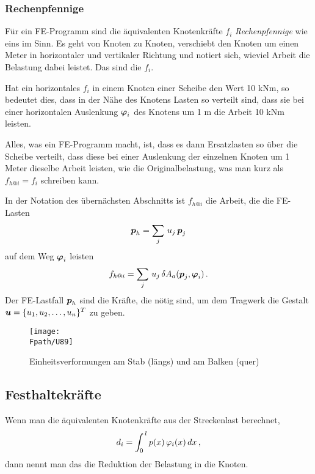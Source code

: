 {\textcolor{sectionTitleBlue}{\subsubsection*{Rechenpfennige}}}\label{Rechenpfennige}

F\"{u}r ein FE-Programm sind die \"{a}quivalenten Knotenkr\"{a}fte $f_i$ {\em Rechenpfennige\/} wie \glq eins im Sinn\grq{}. Es geht von Knoten zu Knoten, verschiebt den Knoten um einen Meter in horizontaler und vertikaler Richtung und notiert sich, wieviel Arbeit die Belastung dabei leistet. Das sind die $f_i$.

Hat ein horizontales $f_i$ in einem Knoten einer Scheibe den Wert 10 kNm, so bedeutet dies, dass in der N\"{a}he des Knotens Lasten so verteilt sind, dass sie bei einer horizontalen Auslenkung $\mbox{\boldmath $\varphi$}_i$ des Knotens um 1 m die Arbeit 10 kNm leisten.

Alles, was ein FE-Programm macht, ist, dass es dann Ersatzlasten so \"{u}ber die Scheibe verteilt, dass diese bei einer Auslenkung der einzelnen Knoten um 1 Meter dieselbe Arbeit leisten, wie die Originalbelastung, was man kurz als $f_{h @i}  = f_i$ schreiben kann.

In der Notation des \"{u}bern\"{a}chsten Abschnitts ist $f_{h @i}$ die Arbeit, die die FE-Lasten
\begin{align}
\mbox{\boldmath $p$}_h = \sum_j\,u_j\,\mbox{\boldmath $p$}_j
\end{align}
auf dem Weg $\mbox{\boldmath $\varphi$}_i$ leisten
\begin{align}
f_{h @i} = \sum_j\,u_j\,\delta A_a(\mbox{\boldmath $p$}_j,\mbox{\boldmath $\varphi$}_i)\,.
\end{align}
Der FE-Lastfall $\mbox{\boldmath $p$}_h$ sind die Kr\"{a}fte, die n\"{o}tig sind, um dem Tragwerk die Gestalt $\mbox{\boldmath $u$} = \{u_1, u_2, \ldots, u_n\}^T$ zu geben.
\begin{figure}[tbp]
\centering
\if {} \sidecaption \fi
\texttt{[image: \\Fpath/U89]}
\caption{Einheitsverformungen am Stab (l\"{a}ngs) und am Balken (quer)} \label{U89}
\end{figure}%

{\textcolor{sectionTitleBlue}{\section{Festhaltekr\"{a}fte}}}
Wenn man die \"{a}quivalenten Knotenkr\"{a}fte aus der Streckenlast berechnet,
\begin{align}\label{Eq85}
d_i = \int_0^{\,l} p(x)\,\varphi_i(x)\,dx\,,
\end{align}
dann nennt man das die Reduktion der Belastung in die Knoten.

